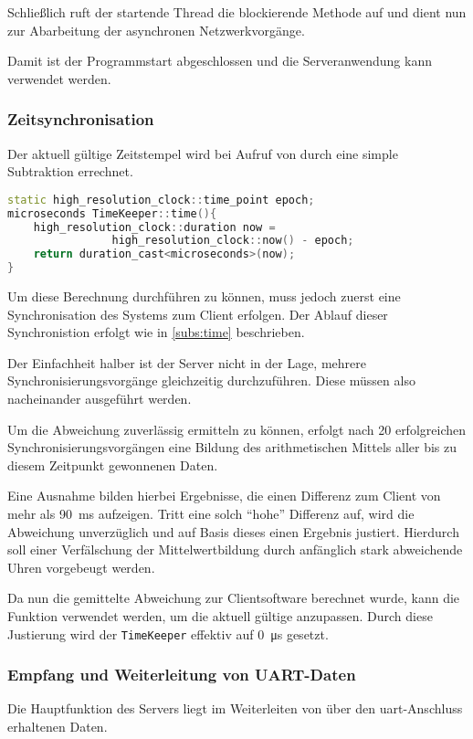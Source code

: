 Schließlich ruft der startende Thread die blockierende Methode
 auf und dient nun zur Abarbeitung der
asynchronen Netzwerkvorgänge.

Damit ist der Programmstart abgeschlossen und die Serveranwendung kann verwendet
werden.
\subsubsection*{Zeitsynchronisation}\label{subs:servertime}
Der aktuell gültige Zeitstempel wird bei Aufruf von
 durch eine simple Subtraktion errechnet.
\begin{lstlisting}[language=C++]
static high_resolution_clock::time_point epoch;
microseconds TimeKeeper::time(){
    high_resolution_clock::duration now = 
    			high_resolution_clock::now() - epoch;
    return duration_cast<microseconds>(now);
}
\end{lstlisting}
Um diese Berechnung durchführen zu können, muss jedoch zuerst eine
Synchronisation des Systems zum Client erfolgen. Der Ablauf dieser
Synchronistion erfolgt wie in \autoref{subs:time} beschrieben.

Der Einfachheit halber ist der Server nicht in der Lage, mehrere
Synchronisierungsvorgänge gleichzeitig durchzuführen. Diese müssen also
nacheinander ausgeführt werden.

Um die Abweichung zuverlässig ermitteln zu können, erfolgt nach 20
erfolgreichen Synchronisierungsvorgängen eine Bildung des arithmetischen Mittels
aller bis zu diesem Zeitpunkt gewonnenen Daten. 

Eine Ausnahme bilden hierbei Ergebnisse, die einen Differenz zum Client von mehr
als \SI{90}{\ms} aufzeigen. Tritt eine solch "`hohe"' Differenz auf, wird die
Abweichung unverzüglich und auf Basis dieses einen Ergebnis justiert. Hierdurch
soll einer Verfälschung der Mittelwertbildung durch anfänglich stark
abweichende Uhren vorgebeugt werden.

Da nun die gemittelte Abweichung zur Clientsoftware berechnet wurde, kann die
Funktion \newline{} verwendet
werden, um die aktuell gültige  anzupassen. Durch diese
Justierung wird der \texttt{TimeKeeper} effektiv auf \SI{0}{\micro\second}
gesetzt.

\subsubsection*{Empfang und Weiterleitung von UART-Daten}
Die Hauptfunktion des Servers liegt im Weiterleiten von über den
\gls{uart}-Anschluss erhaltenen Daten.

